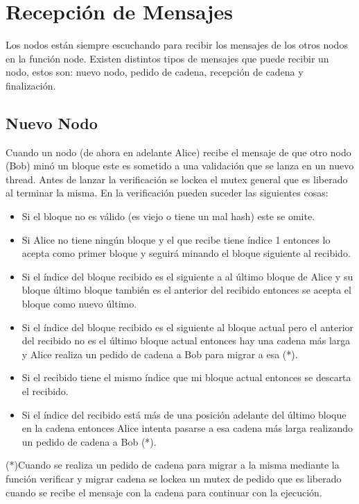 \section{Recepción de Mensajes}

Los nodos están siempre escuchando para recibir los mensajes de los otros nodos en la función node. Existen distintos tipos de mensajes que puede recibir un nodo, estos son: nuevo nodo, pedido de cadena, recepción de cadena y finalización.

\subsection{Nuevo Nodo}
Cuando un nodo (de ahora en adelante Alice) recibe el mensaje de que otro nodo (Bob) minó un bloque este es sometido a una validación que se lanza en un nuevo thread. Antes de lanzar la verificación se lockea el mutex general que es liberado al terminar la misma. En la verificación pueden suceder las siguientes cosas:

\begin{itemize}
    \item Si el bloque no es válido (es viejo o tiene un mal hash) este se omite.
    \item Si Alice no tiene ningún bloque y el que recibe tiene índice 1 entonces lo acepta como primer bloque y seguirá minando el bloque siguiente al recibido.
    \item Si el índice del bloque recibido es el siguiente a al último bloque de Alice y su bloque último bloque también es el anterior del recibido entonces se acepta el bloque como nuevo último.
    \item Si el índice del bloque recibido es el siguiente al bloque actual pero el anterior del recibido no es el último bloque actual entonces hay una cadena más larga y Alice realiza un pedido de cadena a Bob para migrar a esa (*).
    \item Si el recibido tiene el mismo índice que mi bloque actual entonces se descarta el recibido.
    \item Si el índice del recibido está más de una posición adelante del último bloque en la cadena entonces Alice intenta pasarse a esa cadena más larga realizando un pedido de cadena a Bob (*).
\end{itemize}

(*)Cuando se realiza un pedido de cadena para migrar a la misma mediante la función verificar y migrar cadena se lockea un mutex de pedido que es liberado cuando se recibe el mensaje con la cadena para continuar con la ejecución.


